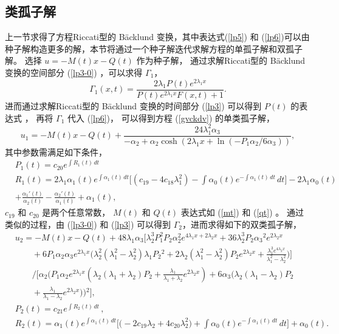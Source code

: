 \subsection{类孤子解}
上一节求得了方程Riccati型的 B\"{a}cklund 变换，其中表达式(\ref{lp5}) 和 (\ref{lp6})可以由种子解构造更多的解，本节将通过一个种子解迭代求解方程的单孤子解和双孤子解。
选择 $u=-M(t)x- Q(t)$ 作为种子解， 通过求解Riccati型的 B\"{a}cklund 变换的空间部分 (\ref{lp3-0}) ，可以求得 $\Gamma_1$，
\begin{equation}
\Gamma _1(x,t)=\frac{2 \lambda _1 P(t)
e^{2 \lambda _1 x}}{P(t) e^{2 \lambda _1 x} F(x,t)+1}.\label{lp10}
\end{equation}
进而通过求解Riccati型的 B\"{a}cklund 变换的时间部分 (\ref{lp3}) 可以得到 $P(t)$ 的表达式 ，
再将 $\Gamma _1$ 代入 (\ref{lp6})， 可以得到方程 (\ref{gvckdv}) 的单类孤子解，
\begin{equation}
u_1=-M(t)x-Q(t)+\frac{24 \lambda _1 ^2 \alpha_3}
{-\alpha_2+ \alpha_2 \cosh(2 \lambda _1 x+\ln (-P_1\alpha_2/6\alpha_3))}
,\label{lp10-1}
\end{equation}
其中参数需满足如下条件，
\begin{align}
& P_1(t)=c_{20} e^{\int R_1(t) \, dt}\\
\nonumber
& R_1(t)=2\lambda _1 \alpha _1(t) {}
e^{ \int \alpha _1(t) \, dt}\big[ ( c_{19}-4 c_{18} \lambda _1^2)
 - \int\! \alpha _0(t)  e^{ -\int\!
\alpha _1(t) \, dt} \, dt
\big]-2 \lambda _1 \alpha _0(t) \\
& +\frac{\alpha _1'(t)}{\alpha _2(t)}-\frac{\alpha _2'(t)}{\alpha _1(t)}+\alpha _1(t){},
\end{align}
$c_{19}$ 和 $c_{20}$ 是两个任意常数， $M(t)$ 和 $Q(t)$ 表达式如 (\ref{mt}) 和 (\ref{qt}) 。
 通过类似的过程，由 (\ref{lp3-0}) 和 (\ref{lp3}) 可以得到 $\Gamma_2$，进而求得如下的双类孤子解，
\begin{align}
&u_2=-M(t)x-Q(t)+48 \lambda _1 \alpha _3
\big[ \lambda_2^3 P_1^2 P_2 \alpha _2^2
e^{4 \lambda _1 x+2 \lambda_2 x}
+36  \lambda _2^3 P_2 \alpha _3{}^2
e^{2 \lambda_2 x}\\
&\quad\quad+6 P_1 \alpha _2 \alpha _3 e^{2 \lambda _1 x}
\big(\lambda _2^2 (\lambda _1^2-\lambda _2^2){} \lambda _1 P_2{}^2
+2 \lambda _2 (\lambda _1^2-\lambda _2^2){} P_2 e^{2 \lambda_2 x}
+ \frac{\lambda _1^3 e^{4 \lambda_2 x}}{\lambda _1^2-\lambda _2^2}\big)\big]
\\ \nonumber
&\quad\quad/ \big[\alpha _2 \big( P_1 \alpha _2
e^{2 \lambda _1 x} (\lambda _2 (\lambda _1+\lambda _2){}
 P_2+ \frac{\lambda _1}{\lambda _1+\lambda _2} e^{2 \lambda_2 x})
 +6 \alpha _3 (\lambda _2
(\lambda _1-\lambda _2){} P_2\\
&\quad\quad + \frac{\lambda _1}{\lambda _1-\lambda _2}
e^{2 \lambda_2 x})\big){}^2\big]
,\label{lp12}\\
&P_2(t)=c_{21} e^{\int\!\! R_2(t) \, dt}\,,\ \\
&R_2(t)=\alpha _1(t) {}
e^{ \int \!\! \alpha _1(t) \, dt}\big[\big(-2 c_{19} \lambda _2
+4 c_{20} \lambda _2^2 \big)
+ \int \!\! \alpha_0(t)  e^{ -\int\!\!
\alpha _1(t) \, dt} \, dt
 \big ]+\alpha _0(t).
\end{align}


